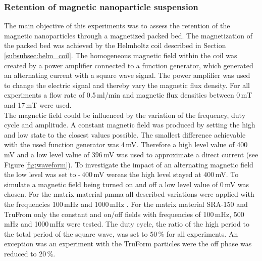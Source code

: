 \subsubsection{Retention of magnetic nanoparticle suspension}
\label{subsubsec:Ret_nanopart_method}
The main objective of this experiments was to assess the retention of the magnetic nanoparticles through a magnetized packed bed. The magnetization of the packed bed was achieved by the Helmholtz coil described in Section\,\ref{subsubsec:helm_coil}. The homogeneous magnetic field within the coil was created by a power amplifier connected to a function generator, which generated an alternating current with a square wave signal. The power amplifier was used to change the electric signal and thereby vary the magnetic flux density. For all experiments a flow rate of 0.5\,ml/min and magnetic flux densities between 0\,mT and 17\,mT were used. \\
The magnetic field could be influenced by the variation of the frequency, duty cycle and amplitude. A constant magnetic field was produced by setting the high and low state to the closest values possible. The smallest difference achievable with the used function generator was 4\,mV. Therefore a high level value of 400\,mV and a low level value of 396\,mV was used to approximate a direct current (see Figure\,\ref{fig:waveform}). To investigate the impact of an alternating magnetic field the low level was set to -\,400\,mV wereas the high level stayed at 400\,mV. To simulate a magnetic field being turned on and off a low level value of 0\,mV was chosen. For the matrix material \gls{pmma} all described variations were applied with the frequencies 100\,mHz and 1000\,mHz . For the matrix material SRA-150 and TruFrom only the constant and on/off fields with frequencies of 100\,mHz, 500\,mHz and 1000\,mHz were tested. The duty cycle, the ratio of the high period to the total period of the square wave, was set to 50\,\% for all experiments. An exception was an experiment with the TruForm particles were the off phase was reduced to 20\,\%.

